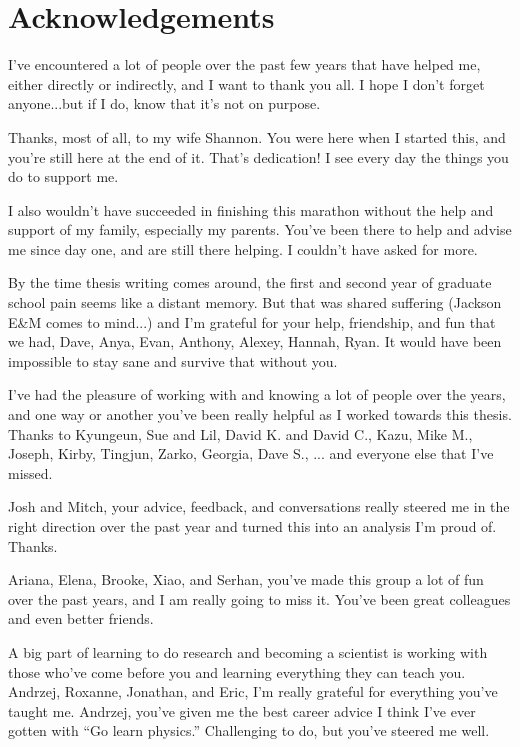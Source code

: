 

\chapter{Acknowledgements} %

I've encountered a lot of people over the past few years that have helped me, either directly or indirectly, and I want to thank you all.  I hope I don't forget anyone...but if I do, know that it's not on purpose.

Thanks, most of all, to my wife Shannon.  You were here when I started this, and you're still here at the end of it.  That's dedication!  I see every day the things you do to support me.  

I also wouldn't have succeeded in finishing this marathon without the help and support of my family, especially my parents.  You've been there to help and advise me since day one, and are still there helping.  I couldn't have asked for more.

By the time thesis writing comes around, the first and second year of graduate school pain seems like a distant memory.  But that was shared suffering (Jackson E\&M comes to mind...) and I'm grateful for your help, friendship, and fun that we had, Dave, Anya, Evan, Anthony, Alexey, Hannah, Ryan.  It would have been impossible to stay sane and survive that without you.

I've had the pleasure of working with and knowing a lot of people over the years, and one way or another you've been really helpful as I worked towards this thesis.  Thanks to Kyungeun, Sue and Lil, David K. and David C., Kazu, Mike M., Joseph, Kirby, Tingjun, Zarko, Georgia, Dave S., ... and everyone else that I've missed.

Josh and Mitch, your advice, feedback, and conversations really steered me in the right direction over the past year and turned this into an analysis I'm proud of.  Thanks.

Ariana, Elena, Brooke, Xiao, and Serhan, you've made this group a lot of fun over the past years, and I am really going to miss it.  You've been great colleagues and even better friends.

A big part of learning to do research and becoming a scientist is working with those who've come before you and learning everything they can teach you.  Andrzej, Roxanne, Jonathan, and Eric, I'm really grateful for everything you've taught me.  Andrzej, you've given me the best career advice I think I've ever gotten with ``Go learn physics.'' Challenging to do, but you've steered me well.

